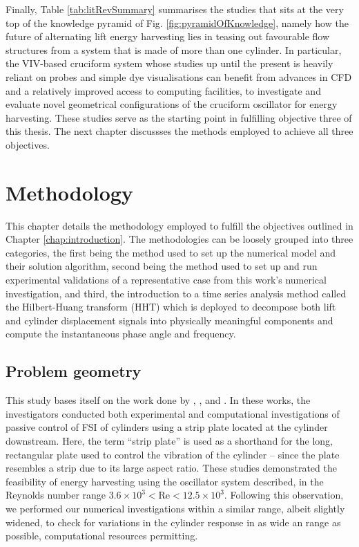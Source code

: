 \documentclass[oneside]{utmthesis}
\begin{document}
Finally, Table \ref{tab:litRevSummary} summarises the studies that sits at the very top of the knowledge pyramid of Fig. \ref{fig:pyramidOfKnowledge}, namely how the future of alternating lift energy harvesting lies in teasing out favourable flow structures from a system that is made of more than one cylinder. In particular, the VIV-based cruciform system whose studies up until the present is heavily reliant on probes and simple dye visualisations can benefit from advances in CFD and a relatively improved access to computing facilities, to investigate and evaluate novel geometrical configurations of the cruciform oscillator for energy harvesting. These studies serve as the starting point in fulfilling objective three of this thesis. The next chapter discussses the methods employed to achieve all three objectives.

\chapter{Methodology} \label{chap:method}
This chapter details the methodology employed to fulfill the objectives outlined in Chapter \ref{chap:introduction}. The methodologies can be loosely grouped into three categories, the first being the method used to set up the numerical model and their solution algorithm, second being the method used to set up and run experimental validations of a representative case from this work's numerical investigation, and third, the introduction to a time series analysis method called the Hilbert-Huang transform (HHT) which is deployed to decompose both lift and cylinder displacement signals into physically meaningful components and compute the instantaneous phase angle and frequency.
\section{Problem geometry} \label{sec:probGeo}
This study bases itself on the work done by \citet{Maruai2017}, \citet{Maruai2018}, and \citet{Koide2013}. In these works, the investigators conducted both experimental and computational investigations of passive control of FSI of cylinders using a strip plate located at the cylinder downstream. Here, the term ``strip plate'' is used as a shorthand for the long, rectangular plate used to control the vibration of the cylinder -- since the plate resembles a strip due to its large aspect ratio. These studies demonstrated the feasibility of energy harvesting using the oscillator system described, in the Reynolds number range $3.6\times10^{3}<\text{Re}<12.5\times10^{3}$. Following this observation, we performed our numerical investigations within a similar \re{} range, albeit slightly widened, to check for variations in the cylinder response in as wide an \re{} range as possible, computational resources permitting.
\end{document}
